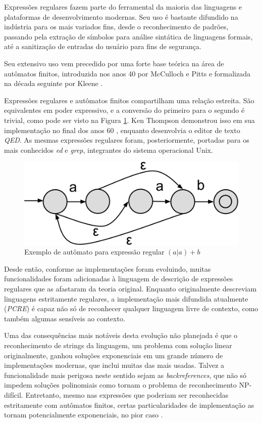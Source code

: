 \documentclass[a4paper,12pt,oneside,onecolumn]{uerj}
\begin{document}
Expressões regulares fazem parte do ferramental da maioria das linguagens e plataformas de desenvolvimento modernas. Seu uso é bastante difundido na indústria para os mais variados fins, desde o reconhecimento de padrões, passando pela extração de símbolos para análise sintática de linguagens formais, até a sanitização de entradas do usuário para fins de segurança.

Seu extensivo uso vem precedido por uma forte base teórica na área de autômatos finitos, introduzida nos anos 40 por McCulloch e Pitts \cite{bib:McCulloch43} e formalizada na década seguinte por Kleene \cite{bib:Kleene56}.

Expressões regulares e autômatos finitos compartilham uma relação estreita. São equivalentes em poder expressivo, e a conversão do primeiro para o segundo é trivial, como pode ser visto na Figura \ref{fig:exemplo_automato}. Ken Thompson demonstrou isso em sua implementação no final dos anos 60 \cite{bib:Thompson68}, enquanto desenvolvia o editor de texto \emph{QED}. As mesmas expressões regulares foram, posteriormente, portadas para os mais conhecidos \emph{ed} e \emph{grep}, integrantes do sistema operacional Unix.

\begin{figure}[!htbp]
  \centering
  \includegraphics[scale=0.3]{figures/exemplo_automato.png}
  \caption{Exemplo de autômato para expressão regular $(a|a)+b$}
  \label{fig:exemplo_automato}
\end{figure}

Desde então, conforme as implementações foram evoluindo, muitas funcionalidades foram adicionadas à linguagem de descrição de expressões regulares que as afastaram da teoria original. Enquanto originalmente descreviam linguagens estritamente regulares, a implementação mais difundida atualmente (\emph{PCRE}) é capaz não só de reconhecer qualquer linguagem livre de contexto, como também algumas sensíveis ao contexto. \cite{bib:Nikita12}

Uma das consequências mais notáveis desta evolução não planejada é que o reconhecimento de strings da linguagem, um problema com solução linear originalmente, ganhou soluções exponenciais em um grande número de implementações modernas, que inclui muitas das mais usadas. Talvez a funcionalidade mais perigosa neste sentido sejam as \emph{backreferences}, que não só impedem soluções polinomiais como tornam o problema de reconhecimento NP-difícil. Entretanto, mesmo nas expressões que poderiam ser reconhecidas estritamente com autômatos finitos, certas particularidades de implementação as tornam potencialmente exponenciais, no pior caso \cite{bib:Cox07}.
\end{document}
